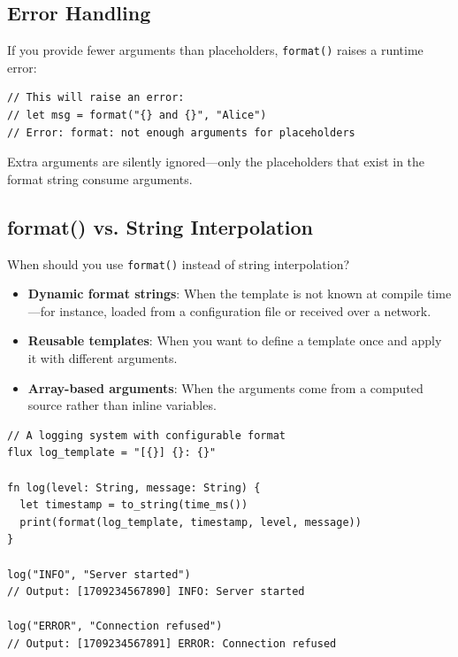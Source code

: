 \subsection{Error Handling}

If you provide fewer arguments than placeholders, \lstinline|format()| raises a runtime error:

\begin{lstlisting}[language=Lattice, caption={format() error on missing arguments}]
// This will raise an error:
// let msg = format("{} and {}", "Alice")
// Error: format: not enough arguments for placeholders
\end{lstlisting}

Extra arguments are silently ignored---only the placeholders that exist in the format string consume arguments.

\subsection{format() vs. String Interpolation}

When should you use \lstinline|format()| instead of string interpolation?

\begin{itemize}
  \item \textbf{Dynamic format strings}: When the template is not known at compile time---for instance, loaded from a configuration file or received over a network.
  \item \textbf{Reusable templates}: When you want to define a template once and apply it with different arguments.
  \item \textbf{Array-based arguments}: When the arguments come from a computed source rather than inline variables.
\end{itemize}

\begin{lstlisting}[language=Lattice, caption={Dynamic templates with format()}]
// A logging system with configurable format
flux log_template = "[{}] {}: {}"

fn log(level: String, message: String) {
  let timestamp = to_string(time_ms())
  print(format(log_template, timestamp, level, message))
}

log("INFO", "Server started")
// Output: [1709234567890] INFO: Server started

log("ERROR", "Connection refused")
// Output: [1709234567891] ERROR: Connection refused
\end{lstlisting}

